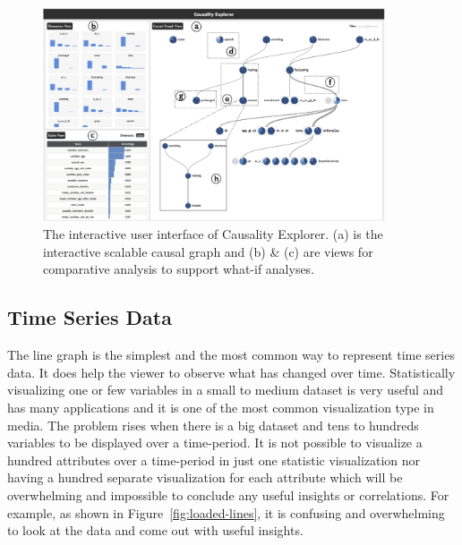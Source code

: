 \begin{figure}[H]
\centering
\captionsetup{justification=centering}
\includegraphics[width=0.9\textwidth]{./pics/cas.png}
\caption{The interactive user interface of Causality Explorer\cite{dua2017uci}. (a) is the interactive scalable causal graph and (b) \& (c) are views for comparative analysis to support what-if analyses.}
\label{fig:cas}
\end{figure}



\subsection{Time Series Data}

The line graph is the simplest and the most common way to represent time series data. It does help the viewer to observe what has changed over time. Statistically visualizing one or few variables in a small to medium dataset is very useful and has many applications and it is one of the most common visualization type in media. The problem rises when there is a big dataset and tens to hundreds variables to be displayed over a time-period. It is not possible to visualize a hundred attributes over a time-period in just one statistic visualization nor having a hundred separate visualization for each attribute which will be overwhelming and impossible to conclude any useful insights or correlations. For example, as shown in Figure~\ref{fig:loaded-lines}, it is confusing and overwhelming to look at the data and come out with useful insights.

